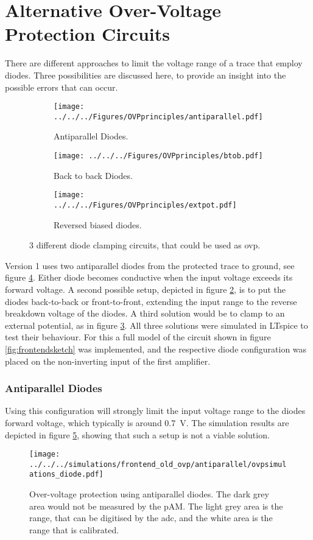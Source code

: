 \section{Alternative Over-Voltage Protection Circuits}
There are different approaches to limit the voltage range of a trace that employ diodes. Three possibilities are discussed here, to provide an insight into the possible errors that can occur.
\begin{figure}
	\centering
	\begin{subfigure}[t]{0.3\textwidth}
		\texttt{[image: ../../../Figures/OVPprinciples/antiparallel.pdf]}
		\caption{Antiparallel Diodes.}
		\label{fig:ovpprinciples:antiparallel}
	\end{subfigure}
	\begin{subfigure}[t]{0.3\textwidth}
	\texttt{[image: ../../../Figures/OVPprinciples/btob.pdf]}
	\caption{Back to back Diodes.}
	\label{fig:ovpprinciples:btob}
	\end{subfigure}
	\begin{subfigure}[t]{0.3\textwidth}
	\texttt{[image: ../../../Figures/OVPprinciples/extpot.pdf]}
	\caption{Reversed biased diodes.}
	\label{fig:ovpprinciples:extpot}
	\end{subfigure}
	\caption{3 different diode clamping circuits, that could be used as \ac{ovp}.}
	\label{fig:ovpprinciples}
\end{figure}
Version 1 uses two antiparallel diodes from the protected trace to ground, see figure \ref{fig:ovpprinciples}. Either diode becomes conductive when the input voltage exceeds its forward voltage. 
A second possible setup, depicted in figure \ref{fig:ovpprinciples:btob}, is to put the diodes back-to-back or front-to-front, extending the input range to the reverse breakdown voltage of the diodes. A third solution would be to clamp to an external potential, as in figure \ref{fig:ovpprinciples:extpot}. All three solutions were simulated in LTspice to test their behaviour. For this a full model of the circuit shown in figure \ref{fig:frontendsketch} was implemented, and the respective diode configuration was placed on the non-inverting input of the first amplifier. 
\subsubsection*{Antiparallel Diodes}
Using this configuration will strongly limit the input voltage range to the diodes forward voltage, which typically is around \SI{0.7}{\volt}. The simulation results are depicted in figure \ref{fig:ovpprinciples:sim:antiparallel}, showing that such a setup is not a viable solution.
\begin{figure}
	\centering
	\texttt{[image: ../../../simulations/frontend\_old\_ovp/antiparallel/ovpsimulations\_diode.pdf]}
	\caption{Over-voltage protection using antiparallel diodes. The dark grey area would not be measured by the \ac{pAM}. The light grey area is the range, that can be digitised by the \ac{adc}, and the white area is the range that is calibrated.}
	\label{fig:ovpprinciples:sim:antiparallel}
\end{figure}
